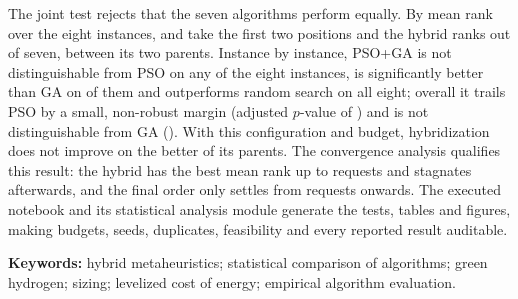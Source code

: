 The joint test rejects that the seven algorithms perform equally. By mean rank over the eight instances, \BestMeanRankAlgorithm{} and \SecondMeanRankAlgorithm{} take the first two positions and the hybrid ranks \ControlRankOrdinalEn{} out of seven, between its two parents. Instance by instance, PSO+GA is not distinguishable from PSO on any of the eight instances, is significantly better than GA on \CtrlGaPlus{} of them and outperforms random search on all eight; overall it trails PSO by a small, non-robust margin (adjusted $p$-value of \CtrlPsoWilcoxonHolmEn) and is not distinguishable from GA (\CtrlGaWilcoxonHolmEn). With this configuration and budget, hybridization does not improve on the better of its parents. The convergence analysis qualifies this result: the hybrid has the best mean rank up to \ConvControlLeadTo{} requests and stagnates afterwards, and the final order only settles from \ConvSettleFrom{} requests onwards. The executed notebook and its statistical analysis module generate the tests, tables and figures, making budgets, seeds, duplicates, feasibility and every reported result auditable.

\vspace{1em}
\noindent\textbf{Keywords:} hybrid metaheuristics; statistical comparison of algorithms; green hydrogen; sizing; levelized cost of energy; empirical algorithm evaluation.

